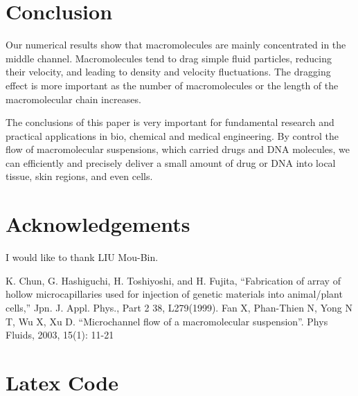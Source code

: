 \documentclass[12pt,a4paper]{article}   %
\begin{document}


\section{Conclusion}                    %
Our numerical results show that macromolecules are mainly concentrated in the middle channel. Macromolecules tend to drag simple fluid particles, reducing their velocity, and leading to density and velocity fluctuations. The dragging effect is more important as the number of macromolecules or the length of the macromolecular chain increases.

The conclusions of this paper is very important for fundamental research and practical applications in bio, chemical and medical engineering. By control the flow of macromolecular suspensions, which carried drugs and DNA molecules, we can efficiently and precisely deliver a small amount of drug or DNA into local tissue, skin regions, and even cells.

\section*{Acknowledgements}             %
I would like to thank LIU Mou-Bin.

\begin{thebibliography}{99}             %
 K. Chun, G. Hashiguchi, H. Toshiyoshi, and H. Fujita, ``Fabrication of array of hollow microcapillaries used for injection of genetic materials into animal/plant cells,'' Jpn. J. Appl. Phys., Part 2 38, L279(1999).
 Fan X, Phan-Thien N, Yong N T, Wu X, Xu D. ``Microchannel flow of a macromolecular suspension''. Phys Fluids, 2003, 15(1): 11-21
\end{thebibliography}


\newpage
\appendix
\appendixpage                           %
\section{Latex Code}                    %

\end{document}
